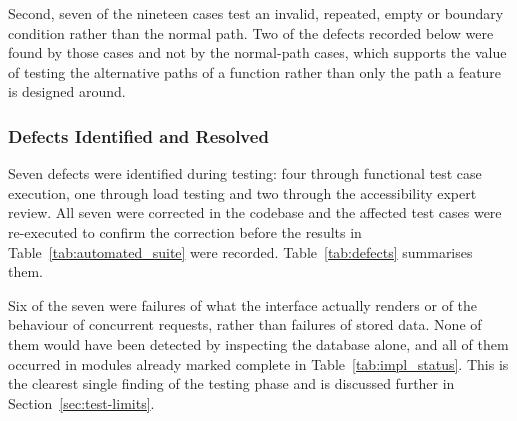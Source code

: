 \documentclass[12pt, oneside]{article} %
\begin{document}
Second, seven of the nineteen cases test an invalid, repeated, empty or boundary condition rather than the normal path. Two of the defects recorded below were found by those cases and not by the normal-path cases, which supports the value of testing the alternative paths of a function rather than only the path a feature is designed around.

\subsubsection{Defects Identified and Resolved}
\label{sec:test-defects}

Seven defects were identified during testing: four through functional test case execution, one through load testing and two through the accessibility expert review. All seven were corrected in the codebase and the affected test cases were re-executed to confirm the correction before the results in Table~\ref{tab:automated_suite} were recorded. Table~\ref{tab:defects} summarises them.

Six of the seven were failures of what the interface actually renders or of the behaviour of concurrent requests, rather than failures of stored data. None of them would have been detected by inspecting the database alone, and all of them occurred in modules already marked complete in Table~\ref{tab:impl_status}. This is the clearest single finding of the testing phase and is discussed further in Section~\ref{sec:test-limits}.
\end{document}
